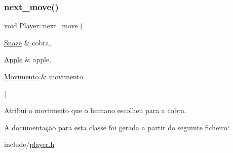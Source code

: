 \subsubsection{\texorpdfstring{next\+\_\+move()}{next\_move()}}
{\footnotesize\ttfamily void Player\+::next\+\_\+move (\begin{DoxyParamCaption}\item[{\hyperlink{classSnaze}{Snaze} \&}]{cobra,  }\item[{\hyperlink{classApple}{Apple} \&}]{apple,  }\item[{\hyperlink{classPlayer_acbe38ac3cf005ce5b63f0bd4e8a12540}{Movimento} \&}]{movimento }\end{DoxyParamCaption})\hspace{0.3cm}{\ttfamily [inline]}}



Atribui o movimento que o humano escolheu para a cobra. 



A documentação para esta classe foi gerada a partir do seguinte ficheiro\+:\begin{DoxyCompactItemize}
\item 
include/\hyperlink{player_8h}{player.\+h}\end{DoxyCompactItemize}
